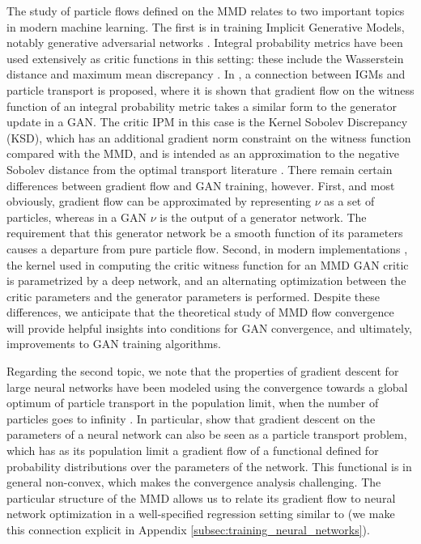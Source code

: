 The study of particle flows defined on the MMD relates to two important topics in modern machine learning. The first is in training Implicit Generative Models, notably generative adversarial networks \cite{gans}.  Integral probability metrics have been used extensively as critic functions in this setting: these include the Wasserstein distance \cite{towards-principled-gans,wgan-gp,sinkhorn-igm} and maximum mean discrepancy \cite{gen-mmd,Li:2015,Li:2017a,cramer-gan,Binkowski:2018,Arbel:2018}.  In \cite[Section 3.3]{Mroueh:2019}, a connection between IGMs and particle transport is proposed, where it is shown that gradient flow on the witness function of an integral probability metric takes a similar form to the generator update in a GAN. The critic IPM in this case is the Kernel Sobolev Discrepancy (KSD), which has an additional gradient norm constraint on the witness function compared with the MMD, and is intended as an approximation to the negative Sobolev distance from the optimal transport literature \cite{Otto:2000,Villani:2009,Peyre:2011}.  There remain certain differences between gradient flow and GAN training, however.  First, and most obviously, gradient flow can be approximated by representing $\nu$ as a set of particles, whereas in a GAN $\nu$ is the output of a generator network. The requirement that this generator network be a smooth function of its parameters causes a departure from pure particle flow. Second, in modern implementations \cite{Li:2017a,Binkowski:2018,Arbel:2018}, the kernel used in computing the critic witness function for an MMD GAN critic is parametrized by a deep network, and an alternating optimization between the critic parameters and the generator parameters is performed. Despite these differences, we anticipate that the theoretical study of MMD flow convergence will provide helpful insights into conditions for GAN convergence, and ultimately, improvements to GAN training algorithms.

Regarding the second topic, we note that the properties of gradient descent for large neural networks
have been modeled using the convergence towards a global optimum of particle transport in the population limit, when the number of particles goes to infinity  \cite{rotskoff2018neural,chizat2018global,mei2018mean,sirignano2018mean}. 
In particular, \cite{rotskoff2019global} show that gradient descent on the parameters of a neural network can also be seen as a particle transport problem, which has as its population limit a gradient flow of a  functional defined for probability distributions over the parameters of the network. 
This functional is in general non-convex, which makes the convergence analysis challenging.
The particular structure of the MMD allows us to relate its gradient flow to neural network optimization in a well-specified regression setting similar to \cite{rotskoff2019global} (we make this connection explicit in Appendix \ref{subsec:training_neural_networks}).

